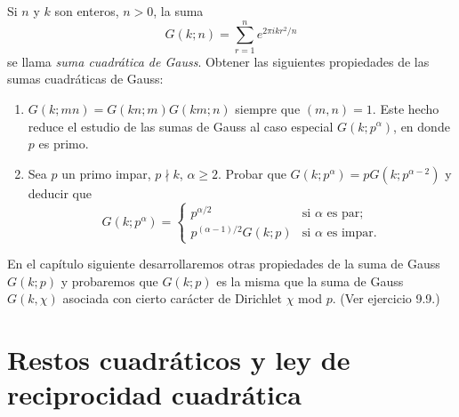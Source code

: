 \documentclass[12pt,a4paper]{book}
\begin{document}
    \begin{ejercicio}
        Si $n$ y $k$ son enteros, $n>0$, la suma
        \begin{equation*}
            G(k;n)=\sum_{r=1}^{n}e^{2\pi ikr^{2}/n}
        \end{equation*}
        se llama \textit{suma cuadrática de Gauss}. Obtener las siguientes propiedades de las\label{sim:Gkn}
        sumas cuadráticas de Gauss:
        \begin{enumerate}
            \item[(a)] $G(k;mn)=G(kn;m)G(km;n)$ siempre que $(m,n)=1$. Este hecho reduce el
            estudio de las sumas de Gauss al caso especial $G(k;p^{\alpha})$, en donde $p$ es
            primo.
            \item[(b)] Sea $p$ un primo impar, $p\nmid k$, $\alpha\geq2$. Probar que
            $G(k;p^{\alpha})=pG(k;p^{\alpha-2})$ y deducir que
            \begin{equation*}
                G(k;p^{\alpha})=
                \begin{cases}
                    p^{\alpha/2}&\text{si }\alpha\text{ es par;}\\
                    p^{(\alpha-1)/2}G(k;p)&\text{si }\alpha\text{ es impar.}
                \end{cases}
            \end{equation*}
        \end{enumerate}
        En el capítulo siguiente desarrollaremos otras propiedades de la suma de Gauss
        $G(k;p)$ y probaremos que $G(k;p)$ es la misma que la suma de Gauss $G(k,\chi)$
        asociada con cierto carácter de Dirichlet $\chi$ mod $p$. (Ver ejercicio 9.9.)
    \end{ejercicio}

\chapter{Restos cuadráticos y ley de reciprocidad cuadrática}

    \newcommand{\leg}[2]{(#1\,|\,#2)}
\end{document}
